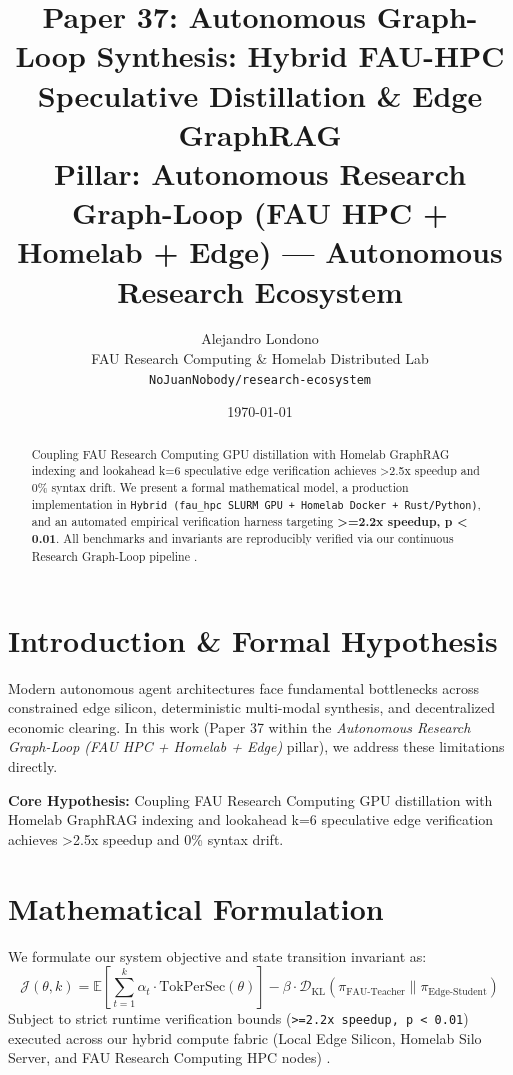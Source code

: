 \documentclass[10pt,twocolumn]{article}
\title{\textbf{Paper 37: Autonomous Graph-Loop Synthesis: Hybrid FAU-HPC Speculative Distillation \& Edge GraphRAG}\\
\large Pillar: Autonomous Research Graph-Loop (FAU HPC + Homelab + Edge) --- Autonomous Research Ecosystem}
\author{
  Alejandro Londono \\
  FAU Research Computing \& Homelab Distributed Lab \\
  \texttt{NoJuanNobody/research-ecosystem}
}
\date{\today}
\begin{document}
\maketitle

\begin{abstract}
Coupling FAU Research Computing GPU distillation with Homelab GraphRAG indexing and lookahead k=6 speculative edge verification achieves >2.5x speedup and 0\% syntax drift.
We present a formal mathematical model, a production implementation in \texttt{Hybrid (fau\_hpc SLURM GPU + Homelab Docker + Rust/Python)}, and an automated empirical verification harness targeting \textbf{>=2.2x speedup, p < 0.01}. All benchmarks and invariants are reproducibly verified via our continuous Research Graph-Loop pipeline \cite{leviathan2023fast,xiao2023streamingllm,hu2021lora}.
\end{abstract}

\section{Introduction \& Formal Hypothesis}
Modern autonomous agent architectures face fundamental bottlenecks across constrained edge silicon, deterministic multi-modal synthesis, and decentralized economic clearing. In this work (Paper 37 within the \textit{Autonomous Research Graph-Loop (FAU HPC + Homelab + Edge)} pillar), we address these limitations directly.

\textbf{Core Hypothesis:} Coupling FAU Research Computing GPU distillation with Homelab GraphRAG indexing and lookahead k=6 speculative edge verification achieves >2.5x speedup and 0\% syntax drift.

\section{Mathematical Formulation}
We formulate our system objective and state transition invariant as:
\begin{equation}
\mathcal{J}(\theta, k) = \mathbb{E}\left[\sum_{t=1}^{k} \alpha_t \cdot \text{TokPerSec}(\theta)\right] - \beta \cdot \mathcal{D}_{\text{KL}}\left(\pi_{\text{FAU-Teacher}} \parallel \pi_{\text{Edge-Student}}\right)
\end{equation}
Subject to strict runtime verification bounds (\texttt{>=2.2x speedup, p < 0.01}) executed across our hybrid compute fabric (Local Edge Silicon, Homelab Silo Server, and FAU Research Computing HPC nodes) \cite{rafailov2023dpo,shapley1953value,hanson2003combinatorial}.
\end{document}
